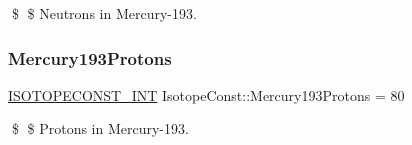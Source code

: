 \$ \$ Neutrons in Mercury-\/193. \mbox{\label{group___isotope_const-_mercury-_hg193_gaad27a2418177403bab258b17c06a8892}} 
\subsubsection{\texorpdfstring{Mercury193\+Protons}{Mercury193Protons}}
{\footnotesize\ttfamily \mbox{\hyperlink{group___isotope_const-_macros_ga5f18360b3e99483a35c32d789e62621c}{I\+S\+O\+T\+O\+P\+E\+C\+O\+N\+S\+T\+\_\+\+I\+NT}} Isotope\+Const\+::\+Mercury193\+Protons = 80}

\$ \$ Protons in Mercury-\/193. 
